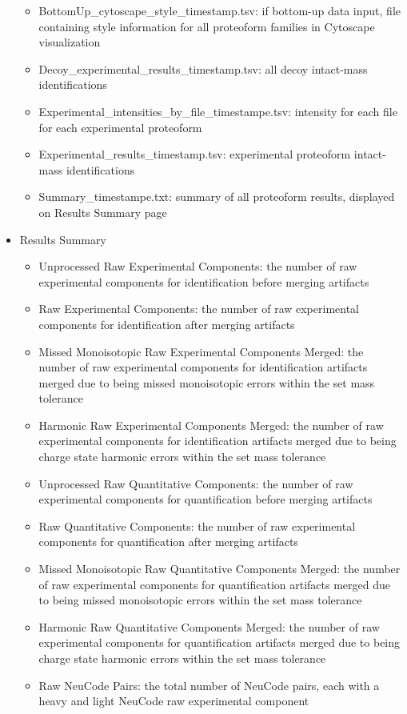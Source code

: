 \begin{itemize}
\begin{itemize}
\item BottomUp\_cytoscape\_style\_timestamp.tsv: if bottom-up data input, file containing style information for all proteoform families in Cytoscape visualization
\item Decoy\_experimental\_results\_timestamp.tsv: all decoy intact-mass identifications
\item Experimental\_intensities\_by\_file\_timestampe.tsv: intensity for each file for each experimental proteoform
\item Experimental\_results\_timestamp.tsv: experimental proteoform intact-mass identifications
\item Summary\_timestampe.txt: summary of all proteoform results, displayed on Results Summary page
\end{itemize}
\item Results Summary
\begin{itemize}
\item Unprocessed Raw Experimental Components: the number of raw experimental components for identification before merging artifacts
\item Raw Experimental Components:  the number of raw experimental components for identification after merging artifacts
\item Missed Monoisotopic Raw Experimental Components Merged: the number of raw experimental components for identification artifacts merged due to being missed monoisotopic errors within the set mass tolerance
\item Harmonic Raw Experimental Components Merged: the number of raw experimental components for identification artifacts merged due to being charge state harmonic errors within the set mass tolerance
\item Unprocessed Raw Quantitative Components: the number of raw experimental components for quantification before merging artifacts
\item Raw Quantitative Components: the number of raw experimental components for quantification after merging artifacts
\item Missed Monoisotopic Raw Quantitative Components Merged: the number of raw experimental components for quantification artifacts merged due to being missed monoisotopic errors within the set mass tolerance
\item Harmonic Raw Quantitative Components Merged: the number of raw experimental components for quantification artifacts merged due to being charge state harmonic errors within the set mass tolerance
\item Raw NeuCode Pairs: the total number of NeuCode pairs, each with a heavy and light NeuCode raw experimental component 

\end{itemize}
\end{itemize}
